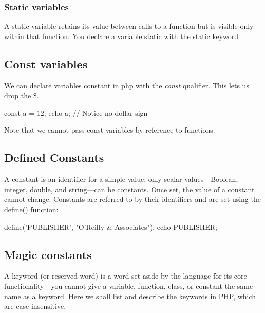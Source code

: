\documentclass{report}
\begin{document}
    \bigbreak \noindent 
    \subsubsection{Static variables}
    \bigbreak \noindent 
    A static variable retains its value between calls to a function but is visible only within that function. You declare a variable static with the static keyword
    \bigbreak \noindent 

    \bigbreak \noindent 
    \subsection{Const variables}
    \bigbreak \noindent 
    We can declare variables constant in php with the \textit{const} qualifier. This lets us drop the \$.
    \bigbreak \noindent 
    \begin{phpcode}
    const a = 12;
    echo a; // Notice no dollar sign
    \end{phpcode}
    \bigbreak \noindent 
    Note that we cannot pass const variables by reference to functions.
    

    \bigbreak \noindent 
    \subsection{Defined Constants}
    \bigbreak \noindent 
    A constant is an identifier for a simple value; only scalar values—Boolean, integer, double, and string—can be constants. Once set, the value of a constant cannot change. Constants are referred to by their identifiers and are set using the define() function:
    \bigbreak \noindent 
    \begin{phpcode}
    define('PUBLISHER', "O'Reilly & Associates");
    echo PUBLISHER;
    \end{phpcode}

    \pagebreak 
    \bigbreak \noindent 
    \subsection{Magic constants}
    \bigbreak \noindent 
    A keyword (or reserved word) is a word set aside by the language for its core functionality—you cannot give a variable, function, class, or constant the same name as a keyword. Here we shall list and describe the keywords in PHP, which are case-insensitive.
    \bigbreak \noindent 
\end{document}
